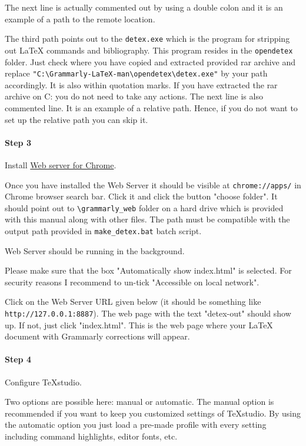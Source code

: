 \documentclass[]{spie}  %
\begin{document}
The next line is actually commented out by using a double colon and it is an example of a path to the remote location.

The third path points out to the \verb|detex.exe| which is the program for stripping out LaTeX commands and bibliography. This program resides in the \verb|opendetex| folder. Just check where you have copied and extracted provided rar archive and replace \verb|"C:\Grammarly-LaTeX-man\opendetex\detex.exe"| by your path accordingly. It is also within quotation marks.
If you have extracted the rar archive on C: you do not need to take any actions.
The next line is also commented line. 
It is an example of a relative path. Hence, if you do not want to set up the relative path you can skip it.

\paragraph{Step 3} Install \href{https://chrome.google.com/webstore/detail/web-server-for-chrome/ofhbbkphhbklhfoeikjpcbhemlocgigb}{Web server for Chrome}. 

Once you have installed the Web Server it should be visible at \verb|chrome://apps/| in Chrome browser search bar. Click it and click the button "choose folder". It should point out to \verb|\grammarly_web| folder on a hard drive which is provided with this manual along with other files. 
The path must be compatible with the output path provided in \verb|make_detex.bat| batch script. 

Web Server should be running in the background.

Please make sure that the box "Automatically show index.html" is selected. 
For security reasons I recommend to un-tick "Accessible on local network".  

Click on the Web Server URL given below (it should be something like \verb|http://127.0.0.1:8887|). 
The web page with the text "detex-out" should show up. 
If not, just click "index.html".
This is the web page where your LaTeX document with Grammarly corrections will appear.


\paragraph{Step 4} Configure TeXstudio.

Two options are possible here: manual or automatic. 
The manual option is recommended if you want to keep you customized settings of TeXstudio. By using the automatic option you just load a pre-made profile with every setting including command highlights, editor fonts, etc.
\end{document}
